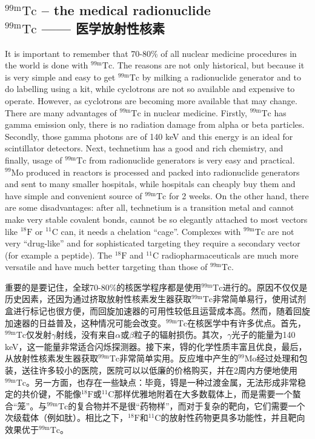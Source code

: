 \documentclass[dvipsnames, svgnames,a4paper,11pt]{article}
\begin{document}
\subsection{${}^\mathrm{99m}\mathrm{Tc}$ – the medical radionuclide \\${}^\mathrm{99m}\mathrm{Tc}$ —— 医学放射性核素}
It is important to remember that 70-80\% of all nuclear medicine procedures in the
world is done with ${}^\mathrm{99m}\mathrm{Tc}$. The reasons are not only historical, but because it is very
simple and easy to get ${}^\mathrm{99m}\mathrm{Tc}$ by milking a radionuclide generator and to do labelling
using a kit, while cyclotrons are not so available and expensive to operate. However,
as cyclotrons are becoming more available that may change. There are many
advantages of ${}^\mathrm{99m}\mathrm{Tc}$ in nuclear medicine. Firstly, ${}^\mathrm{99m}\mathrm{Tc}$ has gamma emission only,
there is no radiation damage from alpha or beta particles. Secondly, those gamma
photons are of 140 keV and this energy is an ideal for scintillator detectors. Next,
technetium has a good and rich chemistry, and finally, usage of ${}^\mathrm{99m}\mathrm{Tc}$ from
radionuclide generators is very easy and practical. ${}^\mathrm{99}\mathrm{Mo}$ produced in reactors is
processed and packed into radionuclide generators and sent to many smaller
hospitals, while hospitals can cheaply buy them and have simple and convenient
source of ${}^\mathrm{99m}\mathrm{Tc}$ for 2 weeks. On the other hand, there are some disadvantages: after
all, technetium is a transition metal and cannot make very stable covalent bonds,
cannot be so elegantly attached to most vectors like ${}^\mathrm{18}\mathrm{F}$ or ${}^\mathrm{11}\mathrm{C}$ can, it needs a
chelation “cage”. Complexes with ${}^\mathrm{99m}\mathrm{Tc}$ are not very “drug-like” and for sophisticated
targeting they require a secondary vector (for example a peptide). The ${}^\mathrm{18}\mathrm{F}$ and ${}^\mathrm{11}\mathrm{C}$
radiopharmaceuticals are much more versatile and have much better targeting than
those of ${}^\mathrm{99m}\mathrm{Tc}$.

重要的是要记住，全球70-80\%的核医学程序都是使用${}^\mathrm{99m}\mathrm{Tc}$进行的。原因不仅仅是历史因素，还因为通过挤取放射性核素发生器获取${}^\mathrm{99m}\mathrm{Tc}$非常简单易行，使用试剂盒进行标记也很方便，而回旋加速器的可用性较低且运营成本高。然而，随着回旋加速器的日益普及，这种情况可能会改变。${}^\mathrm{99m}\mathrm{Tc}$在核医学中有许多优点。首先，${}^\mathrm{99m}\mathrm{Tc}$仅发射$\gamma$射线，没有来自$\alpha$或$\beta$粒子的辐射损伤。其次，$\gamma$光子的能量为140 keV，这一能量非常适合闪烁探测器。接下来，锝的化学性质丰富且优良，最后，从放射性核素发生器获取${}^\mathrm{99m}\mathrm{Tc}$非常简单实用。反应堆中产生的${}^\mathrm{99}\mathrm{Mo}$经过处理和包装，送往许多较小的医院，医院可以以低廉的价格购买，并在2周内方便地使用${}^\mathrm{99m}\mathrm{Tc}$。另一方面，也存在一些缺点：毕竟，锝是一种过渡金属，无法形成非常稳定的共价键，不能像${}^\mathrm{18}\mathrm{F}$或${}^\mathrm{11}\mathrm{C}$那样优雅地附着在大多数载体上，而是需要一个螯合“笼”。与${}^\mathrm{99m}\mathrm{Tc}$的复合物并不是很“药物样”，而对于复杂的靶向，它们需要一个次级载体（例如肽）。相比之下，${}^\mathrm{18}\mathrm{F}$和${}^\mathrm{11}\mathrm{C}$的放射性药物更具多功能性，并且靶向效果优于${}^\mathrm{99m}\mathrm{Tc}$。
\end{document}
